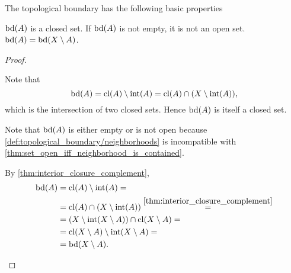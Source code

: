\begin{proposition}\label{thm:topological_boundary_properties}
  The topological boundary has the following basic properties
  \begin{propenum}
     \( \operatorname{bd}(A) \) is a closed set.
     If \( \operatorname{bd}(A) \) is not empty, it is not an open set.
     \( \operatorname{bd}(A) = \operatorname{bd}(X \setminus A) \).
  \end{propenum}
\end{proposition}
\begin{proof}
  \begin{description}
     Note that
    \begin{equation*}
      \operatorname{bd}(A) = \operatorname{cl}(A) \setminus \operatorname{int}(A) = \operatorname{cl}(A) \cap (X \setminus \operatorname{int}(A)),
    \end{equation*}
    which is the intersection of two closed sets. Hence \( \operatorname{bd}(A) \) is itself a closed set.

     Note that \( \operatorname{bd}(A) \) is either empty or is not open because \cref{def:topological_boundary/neighborhoods} is incompatible with \cref{thm:set_open_iff_neighborhood_is_contained}.

     By \cref{thm:interior_closure_complement},
    \begin{align*}
      \operatorname{bd}(A)
      &=
      \operatorname{cl}(A) \setminus \operatorname{int}(A)
      = \\ &=
      \operatorname{cl}(A) \cap (X \setminus \operatorname{int}(A))
      \overset {\ref{thm:interior_closure_complement}} = \\ &=
      (X \setminus \operatorname{int}(X \setminus A)) \cap \operatorname{cl}(X \setminus A)
      = \\ &=
      \operatorname{cl}(X \setminus A) \setminus \operatorname{int}(X \setminus A)
      = \\ &=
      \operatorname{bd}(X \setminus A).
    \end{align*}
  \end{description}
\end{proof}

